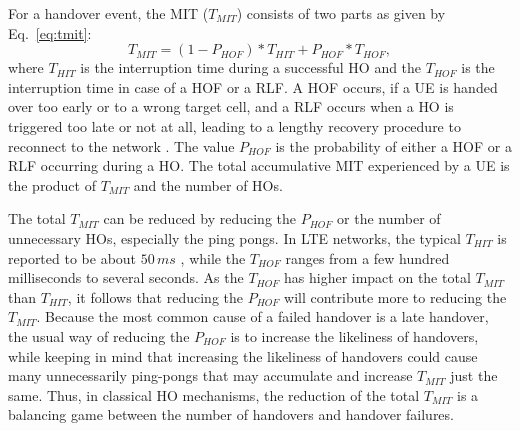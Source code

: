 			For a handover event, the \ac{MIT} ($T_{MIT}$) consists of two parts as given by Eq.~\ref{eq:tmit}:
			\begin{equation}\label{eq:tmit}
				T_{MIT} = (1-P_{HOF})*T_{HIT} + P_{HOF}*T_{HOF},
			\end{equation}
			where $T_{HIT}$ is the interruption time during a successful \ac{HO} and the $T_{HOF}$ is the interruption time in case of a \ac{HOF} or a \ac{RLF}.
			A \ac{HOF} occurs, if a \ac{UE} is handed over too early or to a wrong target cell, and a \ac{RLF} occurs when a \ac{HO} is triggered too late or not at all, leading to a lengthy recovery procedure to reconnect to the network \cite{pred_hoinnr}.
			The value $P_{HOF}$ is the probability of either a \ac{HOF} or a \ac{RLF} occurring during a \ac{HO}.
			The total accumulative \ac{MIT} experienced by a \ac{UE} is the product of $T_{MIT}$ and the number of \acp{HO}.
			
			The total $T_{MIT}$ can be reduced by reducing the $P_{HOF}$ or the number of unnecessary \acp{HO}, especially the ping pongs.
			In \ac{LTE} networks, the typical $T_{HIT}$ is reported to be about $50\,ms$ \cite{eutralatency, eutradescription}, while the $T_{HOF}$ ranges from a few hundred milliseconds to several seconds.
			As the $T_{HOF}$ has higher impact on the total $T_{MIT}$ than $T_{HIT}$, it follows that reducing the $P_{HOF}$ will contribute more to reducing the $T_{MIT}$.
			Because the most common cause of a failed handover is a late handover, the usual way of reducing the $P_{HOF}$ is to increase the likeliness of handovers, while keeping in mind that increasing the likeliness of handovers could cause many unnecessarily ping-pongs that may accumulate and increase $T_{MIT}$ just the same.
			Thus, in classical \ac{HO} mechanisms, the reduction of the total $T_{MIT}$ is a balancing game between the number of handovers and handover failures.
			
